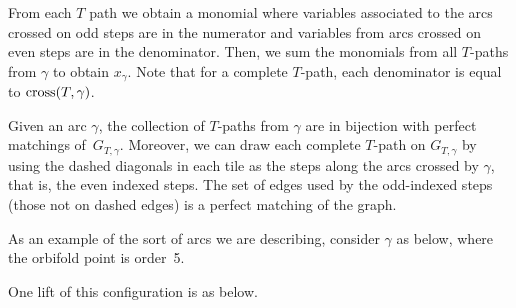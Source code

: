 \documentclass[pdftex]{sigma}%
\numberwithin{equation}{section}
\begin{document}
From each $T$ path we obtain a monomial where variables associated to the arcs crossed on odd steps are in the numerator and variables from arcs crossed on even steps are in the denominator. Then, we sum the monomials from all $T$-paths from $\gamma$ to obtain $x_\gamma$. Note that for a complete $T$-path, each denominator is equal to ${\rm cross}(T,\gamma)$.

Given an arc $\gamma$, the collection of $T$-paths from $\gamma$ are in bijection with perfect matchings of~$G_{T,\gamma}$. Moreover, we can draw each complete $T$-path on $G_{T,\gamma}$ by using the dashed diagonals in each tile as the steps along the arcs crossed by $\gamma$, that is, the even indexed steps. The set of edges used by the odd-indexed steps (those not on dashed edges) is a perfect matching of the graph.

As an example of the sort of arcs we are describing, consider $\gamma$ as below, where the orbifold point is order~5.

\begin{center}
\end{center}

One lift of this configuration is as below.
\end{document}
